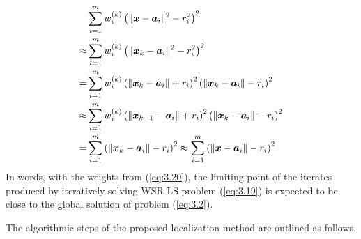 \begin{equation} \label{sr:w}
\nonumber
\begin{aligned}
&\sum_{i=1}^m w_i^{(k)}\left(\|\mbox{\boldmath$x$}-\mbox{\boldmath$a$}_i\|^2-r_i^2\right)^2 \\
 \approx &\sum_{i=1}^m w_i^{(k)}\left(\|\mbox{\boldmath$x$}_k-\mbox{\boldmath$a$}_i\|^2-r_i^2\right)^2 \\
 =&\sum_{i=1}^m w_i^{(k)}\left(\|\mbox{\boldmath$x$}_k-\mbox{\boldmath$a$}_i\|+r_i\right)^2\left(\|\mbox{\boldmath$x$}_k-\mbox{\boldmath$a$}_i\|-r_i\right)^2  \\
 \approx &\sum_{i=1}^m w_i^{(k)}\left(\|\mbox{\boldmath$x$}_{k-1}-\mbox{\boldmath$a$}_i\|+r_i\right)^2\left(\|\mbox{\boldmath$x$}_k-\mbox{\boldmath$a$}_i\|-r_i\right)^2 \\
 =&\sum_{i=1}^m \left(\|\mbox{\boldmath$x$}_k-\mbox{\boldmath$a$}_i\|-r_i\right)^2 \approx \sum_{i=1}^m \left(\|\mbox{\boldmath$x$}-\mbox{\boldmath$a$}_i\|-r_i\right)^2\\
\end{aligned}
\end{equation}
In words, with the weights from (\ref{eq:3.20}), the limiting point of the iterates produced by iteratively solving WSR-LS problem (\ref{eq:3.19}) is expected to be close to the global solution of problem (\ref{eq:3.2}).

The algorithmic steps of the proposed localization method are outlined as follows.

